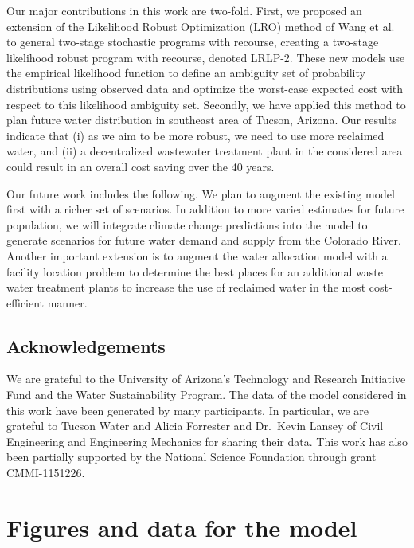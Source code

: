 \documentclass[12pt]{amsart}
\begin{document}
Our major contributions in this work are two-fold. 
First, we proposed an extension of the Likelihood Robust Optimization (LRO) method of Wang et al.\ \cite{wang2010likelihood} to general two-stage stochastic programs with recourse, creating a two-stage likelihood robust program with recourse, denoted LRLP-2.
These new models use the empirical likelihood function to define an ambiguity set of probability distributions using observed data and optimize the worst-case expected cost with respect to this likelihood ambiguity set. 
Secondly, we have applied this method to plan future water distribution in southeast area of Tucson, Arizona. 
Our results indicate that (i) as we aim to be more robust, we need to use more reclaimed water, and (ii) a decentralized wastewater treatment plant in the considered area could result in an overall cost saving over the 40 years.

Our future work includes the following. We plan to augment the existing model first with a richer set of scenarios.
In addition to more varied estimates for future population, we will integrate climate change predictions into the model to generate scenarios for future water demand and supply from the Colorado River. 
Another important extension is to augment the water allocation model with a facility location problem to determine the best places for an additional waste water treatment plants to increase the use of reclaimed water in the most cost-efficient manner.

\subsection*{Acknowledgements}
\noindent We are grateful to the University of Arizona's Technology and Research Initiative Fund and the Water Sustainability Program.  The data of the model considered in this work have been generated by many participants. In particular, we are grateful to Tucson Water and Alicia Forrester and Dr.\ Kevin Lansey of Civil Engineering and Engineering Mechanics for sharing their data. This work has also been partially supported by the National Science Foundation through grant CMMI-1151226.




\pagebreak

\appendix

\section{Figures and data for the model}
\label{app:figures}
\FloatBarrier
\end{document}
